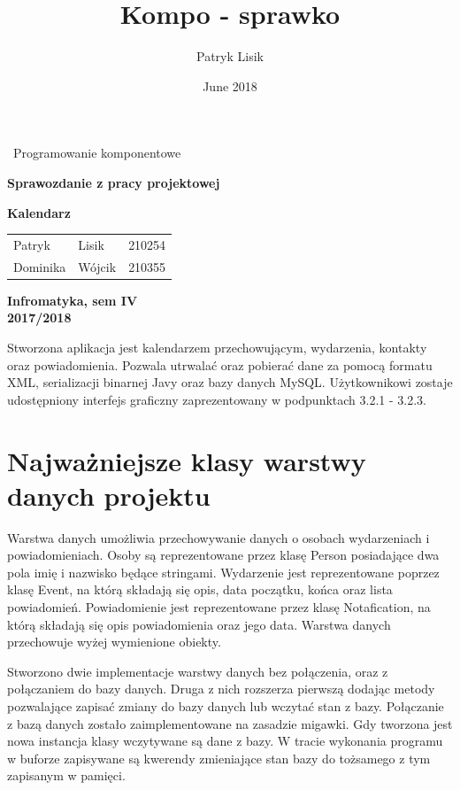 \documentclass[a4paper,12pt]{article}
\title{Kompo - sprawko}
\author{Patryk Lisik}
\date{June 2018}
\begin{document}
\begin{titlepage}
\vspace{10cm}


\centering
{\center\huge\ Programowanie komponentowe \par}
\vspace{1.5cm}
{\center\huge\bfseries Sprawozdanie z pracy projektowej  \par}
\vspace{1.5cm}
{\center\huge\bfseries Kalendarz}

\vspace{6cm}


\begin{flushright}
\begin{tabular}{lll}
Patryk & Lisik & 210254 \\ 
Dominika & Wójcik  & 210355 \\ 
\end{tabular} 
\end{flushright}

\vspace{5cm}

\begin{center}
\textbf{Infromatyka, sem IV \\}
\textbf{2017/2018}
\end{center}
 

\end{titlepage}

Stworzona aplikacja jest kalendarzem przechowującym, wydarzenia, kontakty oraz powiadomienia. Pozwala utrwalać oraz pobierać dane za pomocą formatu XML, serializacji binarnej Javy oraz bazy danych MySQL. Użytkownikowi zostaje udostępniony interfejs graficzny zaprezentowany w podpunktach 3.2.1 -  3.2.3. 
       
\section{Najważniejsze klasy warstwy danych projektu}
Warstwa danych umożliwia przechowywanie danych o osobach wydarzeniach i powiadomieniach. Osoby są reprezentowane przez klasę Person posiadające dwa pola imię i nazwisko będące stringami. Wydarzenie jest reprezentowane poprzez klasę Event, na którą składają się opis, data początku, końca oraz lista powiadomień. Powiadomienie jest reprezentowane przez klasę Notafication, na którą składają się opis powiadomienia oraz jego data. 
Warstwa danych przechowuje wyżej wymienione obiekty.

Stworzono dwie implementacje warstwy danych bez połączenia, oraz z połączaniem do bazy danych. Druga z nich rozszerza pierwszą dodając metody pozwalające zapisać zmiany do bazy danych lub wczytać stan z bazy. Połączanie z bazą danych zostało zaimplementowane na zasadzie migawki. Gdy tworzona jest nowa instancja klasy wczytywane są dane z bazy. W tracie wykonania programu w buforze zapisywane są kwerendy zmieniające stan bazy do tożsamego z tym zapisanym w pamięci. 
\end{document}
